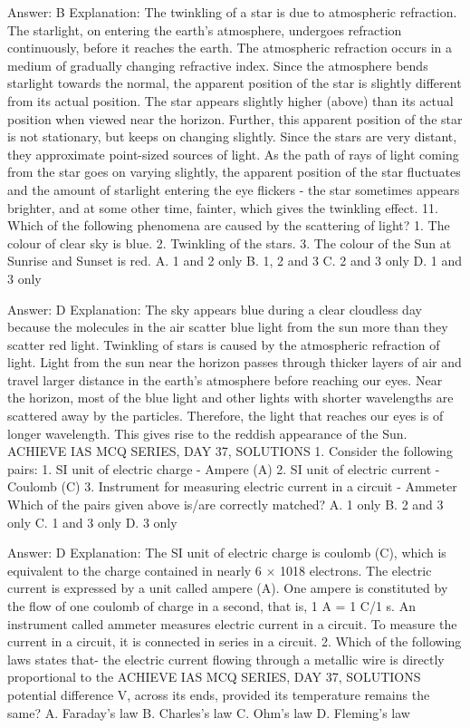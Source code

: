 Answer: B
Explanation: The twinkling of a star is due to atmospheric refraction. The starlight, on entering the earth’s atmosphere, undergoes refraction continuously, before it reaches the earth. The atmospheric refraction occurs in a medium of gradually changing refractive index. Since the atmosphere bends starlight towards the normal, the apparent position of the star is slightly different from its actual position. The star appears slightly higher (above) than its actual position when viewed near the horizon. Further, this apparent position of the star is not stationary, but keeps on changing slightly. Since the stars are very distant, they approximate point-sized sources of light. As the path of rays of light coming from the star goes on varying slightly, the apparent position of the star fluctuates and the amount of starlight entering the eye flickers - the star sometimes appears brighter, and at some other time, fainter, which gives the twinkling effect. 11. Which of the following phenomena are caused by the scattering of light? 1. The colour of clear sky is blue. 2. Twinkling of the stars. 3. The colour of the Sun at Sunrise and Sunset is red. A. 1 and 2 only B. 1, 2 and 3 C. 2 and 3 only D. 1 and 3 only 

Answer: D
Explanation: The sky appears blue during a clear cloudless day because the molecules in the air scatter blue light from the sun more than they scatter red light. Twinkling of stars is caused by the atmospheric refraction of light. Light from the sun near the horizon passes through thicker layers of air and travel larger distance in the earth’s atmosphere before reaching our eyes. Near the horizon, most of the blue light and other lights with shorter wavelengths are scattered away by the particles. Therefore, the light that reaches our eyes is of longer wavelength. This gives rise to the reddish appearance of the Sun. ACHIEVE IAS MCQ SERIES, DAY 37, SOLUTIONS 1. Consider the following pairs: 1. SI unit of electric charge - Ampere (A) 2. SI unit of electric current - Coulomb (C) 3. Instrument for measuring electric current in a circuit - Ammeter Which of the pairs given above is/are correctly matched? A. 1 only B. 2 and 3 only C. 1 and 3 only D. 3 only 

Answer: D
Explanation: The SI unit of electric charge is coulomb (C), which is equivalent to the charge contained in nearly 6 × 1018 electrons. The electric current is expressed by a unit called ampere (A). One ampere is constituted by the flow of one coulomb of charge in a second, that is, 1 A = 1 C/1 s. An instrument called ammeter measures electric current in a circuit. To measure the current in a circuit, it is connected in series in a circuit. 2. Which of the following laws states that- the electric current flowing through a metallic wire is directly proportional to the ACHIEVE IAS MCQ SERIES, DAY 37, SOLUTIONS potential difference V, across its ends, provided its temperature remains the same? A. Faraday's law B. Charles’s law C. Ohm’s law D. Fleming's law 

